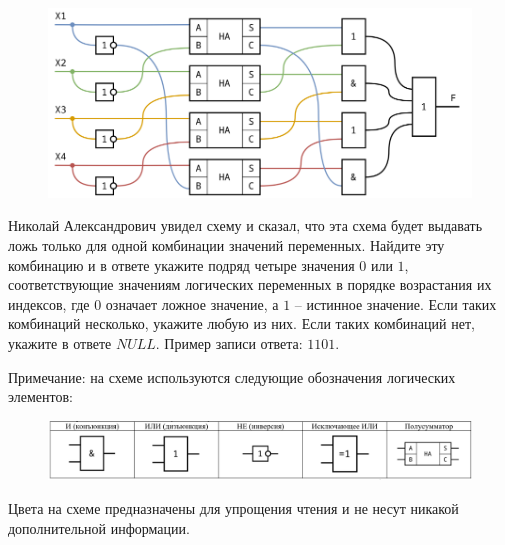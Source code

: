     \begin{figure}[h]
        \centering
        \includegraphics[width=1.0  \linewidth]{images/im3}
    \end{figure}
    Николай Александрович увидел схему и сказал, что эта схема будет выдавать ложь только для одной комбинации
    значений переменных. Найдите эту комбинацию и в ответе укажите подряд четыре значения $0$ или $1$, соответствующие
    значениям логических переменных в порядке возрастания их индексов, где $0$ означает ложное значение, а $1$ – истинное
    значение. Если таких комбинаций несколько, укажите любую из них. Если таких комбинаций нет, укажите в ответе $NULL$.
    Пример записи ответа: $1101$.

    Примечание: на схеме используются следующие обозначения логических элементов:
    \begin{figure}[h]
        \centering
        \includegraphics[width=1.1  \linewidth]{images/im4}
    \end{figure}

    Цвета на схеме предназначены для упрощения чтения и не несут никакой дополнительной информации.

